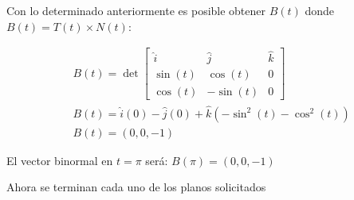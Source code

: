 Con lo determinado anteriormente es posible obtener $B(t)$ donde $B(t)=T(t)\times N(t)$:

\begin{align*}
	 & B(t)=\det \begin{bmatrix}
		             \hat{i}   & \hat{j}    & \hat{k} \\
		             \sin{(t)} & \cos{(t)}  & 0       \\
		             \cos{(t)} & -\sin{(t)} & 0
	             \end{bmatrix}                              \\
	 & B(t)=\hat{i}(0)-\hat{j}(0)+\hat{k}\left(-\sin^2{(t)}-\cos^2{(t)}\right) \\
	 & B(t)=(0,0,-1)
\end{align*}

El vector binormal en $t=\pi$ será: $B(\pi)=(0,0,-1)$

Ahora se terminan cada uno de los planos solicitados

